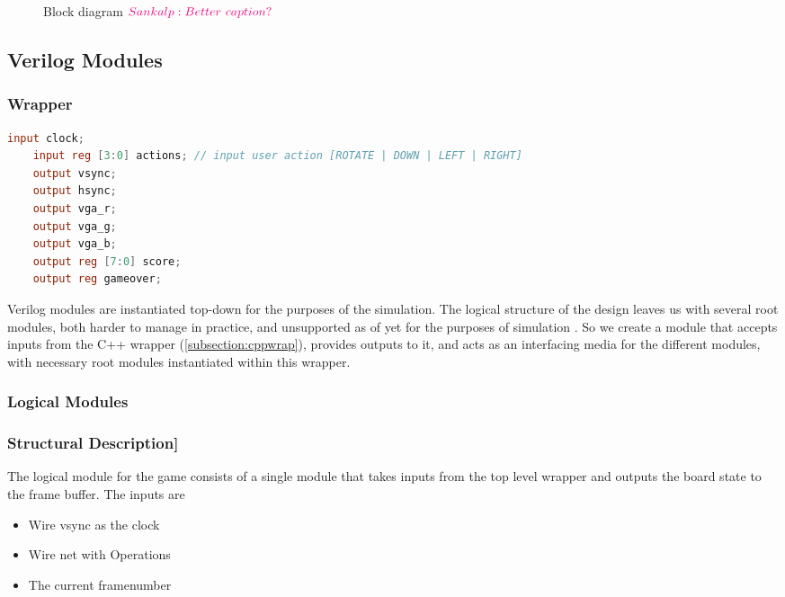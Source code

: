 
\begin{figure}[h]
    \centering
    
    \caption{Block diagram $\sankalp{Better\ caption?}$}
\label{fig:blockdiag}
\end{figure}

\subsection{Verilog Modules}

\subsubsection{Wrapper}
%
\begin{lstlisting}[language=Verilog]
    input clock;
    input reg [3:0] actions; // input user action [ROTATE | DOWN | LEFT | RIGHT]
    output vsync;
    output hsync;
    output vga_r;
    output vga_g;
    output vga_b;
    output reg [7:0] score;
    output reg gameover;
\end{lstlisting}

Verilog modules are instantiated top-down for the purposes of the 
simulation. The logical structure of the design leaves us with 
several root modules, both harder to manage in practice, and 
unsupported as of yet for the purposes of simulation \cite{verilatortopmod}.
So we create a module that accepts inputs from the C++ wrapper (\ref{subsection:cppwrap}),
provides outputs to it, and acts as an interfacing media for the different
modules, with necessary root modules instantiated within this wrapper.

\subsubsection{Logical Modules}
\label{subsection:logicalmod}
\subsubsection{Structural Description]}
\label{subsubsection:Structuraldescr}
The logical module for the game consists of a single module that takes inputs from the top level wrapper and outputs the board state to the frame buffer. \newline
The inputs are 
\begin{itemize}
    \item Wire vsync as the clock 
    \item Wire net with Operations
    \item The current framenumber 
\end{itemize}

